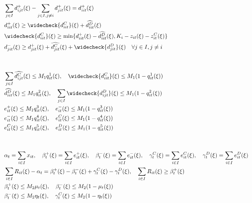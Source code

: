 \documentclass[10pt]{article}
\begin{document}
\begin{align*}
    &\sum_{j \in I}d^+_{ijt}(\xi) - \sum_{j \in I, j \neq i}d^+_{jit}(\xi) = d^+_{iit}(\xi) &\\
    &d^+_{iit}(\xi) \geq \widecheck{d^{C}_{iit}}(\xi) + \widehat{d^{D}_{iit}}(\xi) &\\
    &\widecheck{d^C_{iit}}(\xi) \geq \text{min} \{d^+_{iit}(\xi) - \widehat{d^{D}_{iit}}(\xi), K_i - z_{it}(\xi) - z^C_{it}(\xi) \} &\\
    &d^-_{jit}(\xi) \geq d^+_{jit}(\xi) + \widehat{d^{C}_{jit}}(\xi) + \widecheck{d^{D}_{jit}}(\xi) \quad \forall j \in I, j \neq i &\\
    &&\\ 
    &&\\
    &\sum_{j \in I}\widehat{d^{C}_{ijt}}(\xi) \leq M_1 q^1_{it}(\xi), \quad \widecheck{d^{C}_{iit}}(\xi) \leq M_1 (1 - q^1_{it}(\xi)) &\\
    &\widehat{d^{D}_{iit}}(\xi) \leq M_1 q^2_{it}(\xi), \quad \sum_{j \in I}\widecheck{d^{D}_{ijt}}(\xi) \leq M_1 (1 - q^2_{it}(\xi)) &\\
    &e^{+}_{it}(\xi) \leq M_1 q^3_{it}(\xi), \quad e^{-}_{it}(\xi) \leq M_1 (1 - q^3_{it}(\xi)) &\\
    &e^{-}_{it}(\xi) \leq M_1 q^4_{it}(\xi), \quad e^{C}_{it}(\xi) \leq M_1 (1 - q^4_{it}(\xi)) &\\
    &e^{C}_{it}(\xi) \leq M_1 q^5_{it}(\xi), \quad e^{D}_{it}(\xi) \leq M_1 (1 - q^5_{it}(\xi)) &\\
    &&\\ 
    &&\\
    &\alpha_t = \sum_{i\in I}x_{it}, \quad \beta_t^+(\xi) = \sum_{i\in I}e^+_{it}(\xi), \quad \beta_t^-(\xi) = \sum_{i\in I}e^-_{it}(\xi), \quad \gamma^C_t(\xi) = \sum_{i\in I}e^C_{it}(\xi), \quad \gamma^D_t(\xi) = \sum_{i\in I}e^D_{it}(\xi)&\\
    &\sum_{i \in I} R_{it}(\xi) - \alpha_t = \beta^+_t(\xi) - \beta^-_t(\xi) + \gamma^C_{t}(\xi) - \gamma^D_{t}(\xi), \quad \sum_{i\in I}R_{it}(\xi) \geq \beta_{t}^{+}(\xi)&\\ 
    &\beta^+_t(\xi) \le M_2 \mu_t(\xi), \quad \beta^-_t(\xi) \le M_2 (1 - \mu_t(\xi)) &\\
    &\beta^-_t(\xi) \le M_2 \eta_t(\xi), \quad \gamma^C_t(\xi) \le M_2 (1 - \eta_t(\xi)) &
\end{align*}
\end{document}
